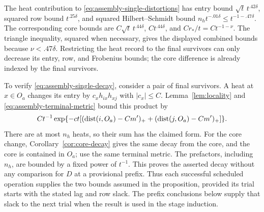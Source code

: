 The heat contribution to
\eqref{eq:assembly-single-distortions} has entry bound
$\sqrt t\,t^{.42\delta}$, squared row bound $t^{.25\delta}$,
and squared Hilbert--Schmidt bound
$n_h t^{-.01\delta}\le t^{-1-.47\delta}$.
The corresponding core bounds are
$C\sqrt t\,t^{.44\delta}$, $Ct^{.44\delta}$, and
$Cr_*/t=Ct^{-1-\nu}$.  The triangle inequality, squared when
necessary, gives the displayed combined bounds because
$\nu<.47\delta$. Restricting the heat record to the final survivors can
only decrease its entry, row, and Frobenius bounds; the core difference
is already indexed by the final survivors.

To verify \eqref{eq:assembly-single-decay}, consider a pair of final
survivors. A heat at $x\in O_a$ changes its entry by
$c_xh_{ix}h_{xj}$ with $|c_x|\le C$.
Lemma~\ref{lem:locality} and \eqref{eq:assembly-terminal-metric}
bound this product by
\[
 Ct^{-1}\exp\{-ct[(\operatorname{dist}(i,O_a)-Cm')_+
                         +(\operatorname{dist}(j,O_a)-Cm')_+]\}.
\]
There are at most $n_h$ heats, so their sum has the claimed form.
For the core change, Corollary~\ref{cor:core-decay} gives the same decay
from the core, and the core is contained in $O_a$; use the same terminal
metric.
The prefactors, including $n_h$, are bounded by a fixed power of $t^{-1}$.
This proves the asserted decay without any comparison for $D$ at a
provisional prefix. Thus each successful scheduled operation supplies
the two bounds assumed in the proposition, provided its trial starts with
the stated lag and row slack. The prefix conclusions below supply that
slack to the next trial when the result is used in the stage induction.

